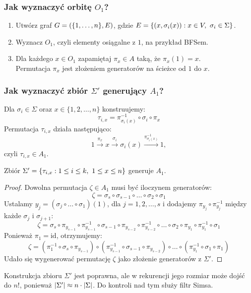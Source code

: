 \newpage
\subsubsection*{Jak wyznaczyć orbitę \(O_1\)?}
\begin{greyframe}
    \begin{enumerate}
        \item Utwórz graf \( G=(\set{1, \ldots, n}, E) \), gdzie \( E = \set{(x, \sigma_i(x)) : x \in V, \ \sigma_i \in \Sigma } \).
        \item Wyznacz \( O_1 \), czyli elementy osiągalne z \( 1 \), na przykład BFSem.
        \item Dla każdego \( x \in O_1 \) zapamiętaj \( \pi_x \in A \) taką, że \( \pi_x(1) = x \). \\
        Permutacja \(\pi_x\) jest złożeniem generatorów na ścieżce od \( 1 \) do \( x \).
    \end{enumerate}
\end{greyframe}

\subsubsection*{Jak wyznaczyć zbiór \(\Sigma'\) generujący \(A_1\)?}
Dla \(\sigma_i \in \Sigma\) oraz \(x \in \{1, 2, \ldots, n\}\) konstruujemy:
\[
    \tau_{i,x} = \pi_{\sigma_i(x)}^{-1} \circ \sigma_i \circ \pi_x
\]
Permutacja \(\tau_{i,x}\) działa następująco:
\[
    1 \xrightarrow{\pi_x} x \xrightarrow{\sigma_i} \sigma_i(x) \xrightarrow{\pi_{\sigma_i(x)}^{-1}} 1,
\]
czyli \(\tau_{i,x} \in A_1\).

\begin{lemma}[Schreiera]
    Zbiór \( \Sigma' = \set{\tau_{i,x} : 1 \leq i \leq k, \ 1 \leq x \leq n} \) generuje \( A_1 \).
\end{lemma}
\begin{proof}
    Dowolna permutacja \(\zeta \in A_1\) musi być iloczynem generatorów:
    \[
        \zeta = \sigma_s \circ \sigma_{s-1} \circ \ldots \circ \sigma_2 \circ \sigma_1
    \]
    Ustalamy \(y_j = (\sigma_j \circ \ldots \circ \sigma_1)(1)\), dla \(j = 1, 2, \ldots, s\) i dodajemy \(\pi_{y_j} \circ \pi_{y_j}^{-1}\) między każde \(\sigma_j\) i \(\sigma_{j+1}\):
    \[
        \zeta = \sigma_s \circ \pi_{y_{s-1}} \circ \pi_{y_{s-1}}^{-1} \circ \sigma_{s-1} \circ \pi_{y_{s-2}} \circ \pi_{y_{s-2}}^{-1} \circ \ldots \circ \sigma_2 \circ \pi_{y_1} \circ \pi_{y_1}^{-1} \circ \sigma_1
    \]
    Ponieważ \(\pi_1 = \text{id}\), otrzymujemy:
    \[
        \zeta = (\pi_1^{-1} \circ \sigma_s \circ \pi_{y_{s-1}}) \circ (\pi_{y_{s-1}}^{-1} \circ \sigma_{s-1} \circ \pi_{y_{s-2}}) \circ \ldots \circ (\pi_{y_1}^{-1} \circ \sigma_1 \circ \pi_1)
    \]
    Udało się wygenerować permutację \(\zeta\) jako złożenie generatorów z \(\Sigma'\).
\end{proof}
Konstrukcja zbioru \( \Sigma' \) jest poprawna, ale w rekurencji jego rozmiar może dojść do \( n! \), ponieważ \( \left\lvert\Sigma'\right\rvert \approx n \cdot \left\lvert\Sigma\right\rvert \).
Do kontroli nad tym służy filtr Simsa.

